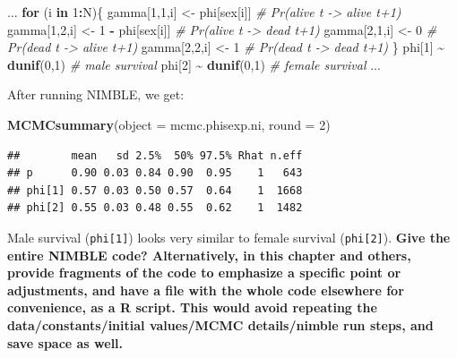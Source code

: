 \documentclass[
  12pt,
]{krantz}
\newenvironment{Shaded}{\begin{snugshade}}{\end{snugshade}}
\newcommand{\AttributeTok}[1]{\textcolor[rgb]{0.13,0.29,0.53}{#1}}
\newcommand{\CommentTok}[1]{\textcolor[rgb]{0.56,0.35,0.01}{\textit{#1}}}
\newcommand{\ControlFlowTok}[1]{\textcolor[rgb]{0.13,0.29,0.53}{\textbf{#1}}}
\newcommand{\DecValTok}[1]{\textcolor[rgb]{0.00,0.00,0.81}{#1}}
\newcommand{\FunctionTok}[1]{\textcolor[rgb]{0.13,0.29,0.53}{\textbf{#1}}}
\newcommand{\NormalTok}[1]{#1}
\newcommand{\OtherTok}[1]{\textcolor[rgb]{0.56,0.35,0.01}{#1}}
\newcommand{\SpecialCharTok}[1]{\textcolor[rgb]{0.81,0.36,0.00}{\textbf{#1}}}
\begin{document}
\begin{Shaded}
\begin{Highlighting}[]
\NormalTok{...}
\ControlFlowTok{for}\NormalTok{ (i }\ControlFlowTok{in} \DecValTok{1}\SpecialCharTok{:}\NormalTok{N)\{}
\NormalTok{  gamma[}\DecValTok{1}\NormalTok{,}\DecValTok{1}\NormalTok{,i] }\OtherTok{\textless{}{-}}\NormalTok{ phi[sex[i]]      }\CommentTok{\# Pr(alive t {-}\textgreater{} alive t+1)}
\NormalTok{  gamma[}\DecValTok{1}\NormalTok{,}\DecValTok{2}\NormalTok{,i] }\OtherTok{\textless{}{-}} \DecValTok{1} \SpecialCharTok{{-}}\NormalTok{ phi[sex[i]]  }\CommentTok{\# Pr(alive t {-}\textgreater{} dead t+1)}
\NormalTok{  gamma[}\DecValTok{2}\NormalTok{,}\DecValTok{1}\NormalTok{,i] }\OtherTok{\textless{}{-}} \DecValTok{0}                \CommentTok{\# Pr(dead t {-}\textgreater{} alive t+1)}
\NormalTok{  gamma[}\DecValTok{2}\NormalTok{,}\DecValTok{2}\NormalTok{,i] }\OtherTok{\textless{}{-}} \DecValTok{1}                \CommentTok{\# Pr(dead t {-}\textgreater{} dead t+1)}
\NormalTok{\}}
\NormalTok{phi[}\DecValTok{1}\NormalTok{] }\SpecialCharTok{\textasciitilde{}} \FunctionTok{dunif}\NormalTok{(}\DecValTok{0}\NormalTok{,}\DecValTok{1}\NormalTok{) }\CommentTok{\# male survival}
\NormalTok{phi[}\DecValTok{2}\NormalTok{] }\SpecialCharTok{\textasciitilde{}} \FunctionTok{dunif}\NormalTok{(}\DecValTok{0}\NormalTok{,}\DecValTok{1}\NormalTok{) }\CommentTok{\# female survival}
\NormalTok{...}
\end{Highlighting}
\end{Shaded}

After running NIMBLE, we get:

\begin{Shaded}
\begin{Highlighting}[]
\FunctionTok{MCMCsummary}\NormalTok{(}\AttributeTok{object =}\NormalTok{ mcmc.phisexp.ni, }\AttributeTok{round =} \DecValTok{2}\NormalTok{)}
\end{Highlighting}
\end{Shaded}

\begin{verbatim}
##        mean   sd 2.5%  50% 97.5% Rhat n.eff
## p      0.90 0.03 0.84 0.90  0.95    1   643
## phi[1] 0.57 0.03 0.50 0.57  0.64    1  1668
## phi[2] 0.55 0.03 0.48 0.55  0.62    1  1482
\end{verbatim}

Male survival (\texttt{phi{[}1{]}}) looks very similar to female survival (\texttt{phi{[}2{]}}). \textbf{Give the entire NIMBLE code? Alternatively, in this chapter and others, provide fragments of the code to emphasize a specific point or adjustments, and have a file with the whole code elsewhere for convenience, as a R script. This would avoid repeating the data/constants/initial values/MCMC details/nimble run steps, and save space as well.}
\end{document}
